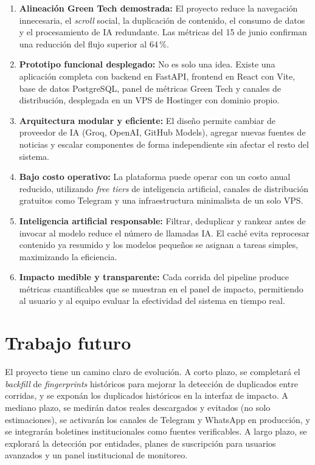 \begin{enumerate}[nosep]
    \item \textbf{Alineaci\'on Green Tech demostrada:} El proyecto reduce la navegaci\'on innecesaria, el \textit{scroll} social, la duplicaci\'on de contenido, el consumo de datos y el procesamiento de IA redundante. Las m\'etricas del 15 de junio confirman una reducci\'on del flujo superior al 64\,\%.
    \item \textbf{Prototipo funcional desplegado:} No es solo una idea. Existe una aplicaci\'on completa con backend en FastAPI, frontend en React con Vite, base de datos PostgreSQL, panel de m\'etricas Green Tech y canales de distribuci\'on, desplegada en un VPS de Hostinger con dominio propio.
    \item \textbf{Arquitectura modular y eficiente:} El dise\~no permite cambiar de proveedor de IA (Groq, OpenAI, GitHub Models), agregar nuevas fuentes de noticias y escalar componentes de forma independiente sin afectar el resto del sistema.
    \item \textbf{Bajo costo operativo:} La plataforma puede operar con un costo anual reducido, utilizando \textit{free tiers} de inteligencia artificial, canales de distribuci\'on gratuitos como Telegram y una infraestructura minimalista de un solo VPS.
    \item \textbf{Inteligencia artificial responsable:} Filtrar, deduplicar y rankear antes de invocar al modelo reduce el n\'umero de llamadas IA. El cach\'e evita reprocesar contenido ya resumido y los modelos peque\~nos se asignan a tareas simples, maximizando la eficiencia.
    \item \textbf{Impacto medible y transparente:} Cada corrida del pipeline produce m\'etricas cuantificables que se muestran en el panel de impacto, permitiendo al usuario y al equipo evaluar la efectividad del sistema en tiempo real.
\end{enumerate}

\section*{Trabajo futuro}

El proyecto tiene un camino claro de evoluci\'on. A corto plazo, se completar\'a el \textit{backfill} de \textit{fingerprints} hist\'oricos para mejorar la detecci\'on de duplicados entre corridas, y se expon\'an los duplicados hist\'oricos en la interfaz de impacto. A mediano plazo, se medir\'an datos reales descargados y evitados (no solo estimaciones), se activar\'an los canales de Telegram y WhatsApp en producci\'on, y se integrar\'an boletines institucionales como fuentes verificables. A largo plazo, se explorar\'a la detecci\'on por entidades, planes de suscripci\'on para usuarios avanzados y un panel institucional de monitoreo.

